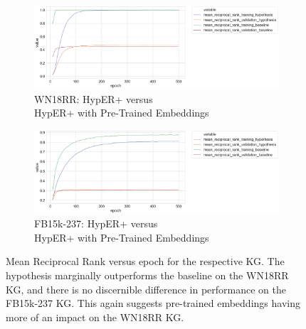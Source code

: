 \begin{figure}
	\begin{subfigure}[b]{.5\linewidth}
   		\centering
    		\includegraphics[width=1.0\linewidth, height=0.6\linewidth]{WN18RR_mean_reciprocal_rank_Results_ptwv}
		\captionsetup{justification=centering}
		\caption{WN18RR: HypER+ versus \\ HypER+ with Pre-Trained Embeddings}
	\end{subfigure}
	\begin{subfigure}[b]{.5\linewidth}
   		\centering
		\includegraphics[width=1.0\linewidth, height=0.6\linewidth]{FB15k-237_mean_reciprocal_rank_Results_ptwv}
		\captionsetup{justification=centering}
		\caption{FB15k-237: HypER+ versus \\ HypER+ with Pre-Trained Embeddings}
	\end{subfigure}
	\caption{Mean Reciprocal Rank versus epoch for the respective KG. The hypothesis marginally outperforms the baseline on the WN18RR KG, and there is no discernible difference in performance on the FB15k-237 KG. This again suggests pre-trained embeddings having more of an impact on the WN18RR KG.}
\end{figure}


